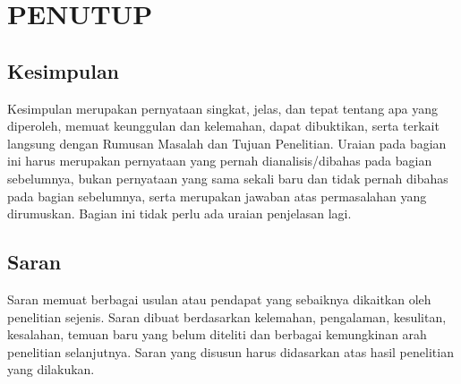 \chapter{PENUTUP}

\section{Kesimpulan}
\begin{isi}
Kesimpulan merupakan pernyataan singkat, jelas, dan tepat tentang
apa yang diperoleh, memuat keunggulan dan kelemahan, dapat
dibuktikan, serta terkait langsung dengan Rumusan Masalah dan
Tujuan Penelitian. Uraian pada bagian ini harus merupakan
pernyataan yang pernah dianalisis/dibahas pada bagian sebelumnya,
bukan pernyataan yang sama sekali baru dan tidak pernah dibahas
pada bagian sebelumnya, serta merupakan jawaban atas
permasalahan yang dirumuskan. Bagian ini tidak perlu ada uraian
penjelasan lagi.
\end{isi}

\section{Saran}
\begin{isi}
Saran memuat berbagai usulan atau pendapat yang sebaiknya
dikaitkan oleh penelitian sejenis. Saran dibuat berdasarkan
kelemahan, pengalaman, kesulitan, kesalahan, temuan baru yang
belum diteliti dan berbagai kemungkinan arah penelitian
selanjutnya. Saran yang disusun harus didasarkan atas hasil
penelitian yang dilakukan.
\end{isi}
